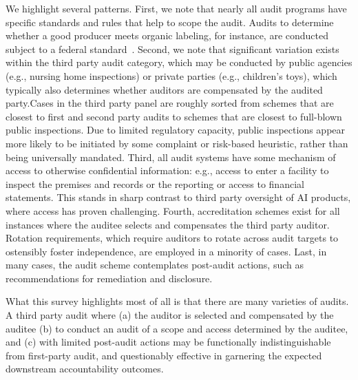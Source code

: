 \documentclass[sigconf]{acmart}
\begin{document}
We highlight several patterns. First, we note that nearly all audit programs have specific standards and rules that help to scope the audit. Audits to determine whether a good producer meets organic labeling, for instance, are conducted subject to a federal standard~\cite{agri_report}.
Second, we note that significant variation exists within the third party audit category, which may be conducted by public agencies (e.g., nursing home inspections) or private parties (e.g., children’s toys), which typically also determines whether auditors are compensated by the audited party.Cases in the third party panel are roughly sorted from schemes that are closest to first and second party audits to schemes that are closest to full-blown public inspections. Due to limited regulatory capacity, public inspections appear more likely to be initiated by some complaint or risk-based heuristic, rather than being universally mandated. Third, all audit systems have some mechanism of access to otherwise confidential information: e.g., access to enter a facility to inspect the premises and records or the reporting or access to financial statements. This stands in sharp contrast to third party oversight of AI products, where access has proven challenging. Fourth, accreditation schemes exist for all instances where the auditee selects and compensates the third party auditor. Rotation requirements, which require auditors to rotate across audit targets to ostensibly foster independence, are employed in a minority of cases. Last, in many cases, the audit scheme contemplates post-audit actions, such as recommendations for remediation and disclosure. 

What this survey highlights most of all is that there are many varieties of audits. A third party audit where (a) the auditor is selected and compensated by the auditee (b) to conduct an audit of a scope and access determined by the auditee, and (c) with limited post-audit actions may be functionally indistinguishable from first-party audit, and questionably effective in garnering the expected downstream accountability outcomes. 
\end{document}
